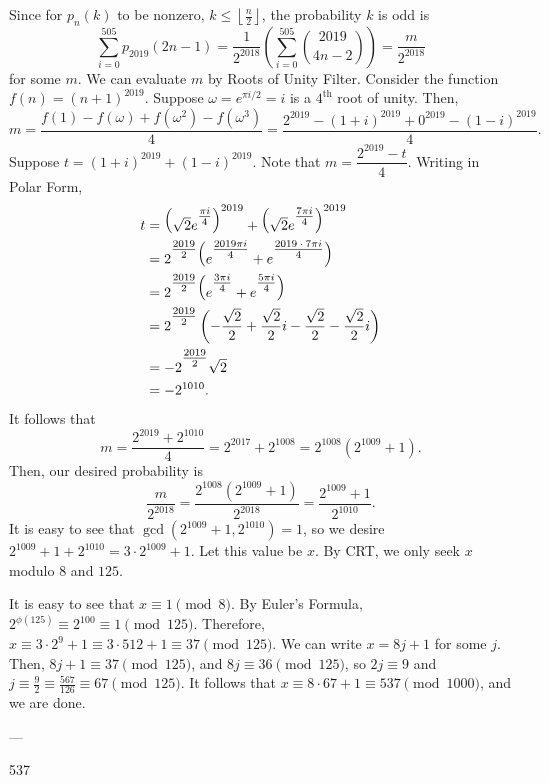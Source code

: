 Since for $p_n(k)$ to be nonzero, $k\le\left\lfloor\frac{n}{2}\right\rfloor$, the probability $k$ is odd is
\[\sum_{i=0}^{505}p_{2019}(2n-1)=\frac{1}{2^{2018}}\left(\sum_{i=0}^{505}\binom{2019}{4n-2}\right)=\frac{m}{2^{2018}}\]
for some $m$. We can evaluate $m$ by Roots of Unity Filter. Consider the function $f(n)=(n+1)^{2019}$. Suppose $\omega=e^{\pi i/2}=i$ is a $4^\text{th}$ root of unity. Then, \[m=\frac{f\left(1\right)-f\left(\omega\right)+f\left(\omega^2\right)-f\left(\omega^3\right)}{4}=\frac{2^{2019}-(1+i)^{2019}+0^{2019}-(1-i)^{2019}}{4}.\]
Suppose $t=(1+i)^{2019}+(1-i)^{2019}$. Note that $m=\dfrac{2^{2019}-t}{4}$. Writing in Polar Form,
\begin{align*}
    t&=\raisebox{4pt}{$\left(\text{\raisebox{-4pt}{$\sqrt{2}e^{\text{\raisebox{4pt}{$\frac{\raisebox{1pt}{$\pi i$}}{\raisebox{-1.75pt}{$4$}}$}}}$}}\right)^{2019}$}+\raisebox{4pt}{$\left(\text{\raisebox{-4pt}{$\sqrt{2}e^{\text{\raisebox{4pt}{$\frac{\raisebox{1pt}{$7\pi i$}}{\raisebox{-1.75pt}{$4$}}$}}}$}}\right)^{2019}$} \\
    &=2^{\text{\raisebox{4pt}{$\frac{\raisebox{1pt}{$2019$}}{\raisebox{-1.75pt}{$2$}}$}}}\text{\raisebox{4pt}{$\left(\text{\raisebox{-4pt}{$e^{\text{\raisebox{4pt}{$\frac{\raisebox{1pt}{$2019\pi i$}}{\raisebox{-1.75pt}{$4$}}$}}}+e^{\text{\raisebox{4pt}{$\frac{\raisebox{1pt}{$2019\cdot 7\pi i$}}{\raisebox{-1.75pt}{$4$}}$}}}$}}\right)$}} \\
    &=2^{\text{\raisebox{4pt}{$\frac{\raisebox{1pt}{$2019$}}{\raisebox{-1.75pt}{$2$}}$}}}\text{\raisebox{4pt}{$\left(\text{\raisebox{-4pt}{$e^{\text{\raisebox{4pt}{$\frac{\raisebox{1pt}{$3\pi i$}}{\raisebox{-1.75pt}{$4$}}$}}}+e^{\text{\raisebox{4pt}{$\frac{\raisebox{1pt}{$5\pi i$}}{\raisebox{-1.75pt}{$4$}}$}}}$}}\right)$}} \\
    &=2^{\text{\raisebox{4pt}{$\frac{\raisebox{1pt}{$2019$}}{\raisebox{-1.75pt}{$2$}}$}}}\left(-\frac{\sqrt{2}}{2}+\frac{\sqrt{2}}{2}i-\frac{\sqrt{2}}{2}-\frac{\sqrt{2}}{2}i\right) \\
    &=-2^{\text{\raisebox{4pt}{$\frac{\raisebox{1pt}{$2019$}}{\raisebox{-1.75pt}{$2$}}$}}}\sqrt{2} \\
    &=-2^{1010}.
\end{align*}
It follows that \[m=\frac{2^{2019}+2^{1010}}{4}=2^{2017}+2^{1008}=2^{1008}\left(2^{1009}+1\right).\]
Then, our desired probability is \[\frac{m}{2^{2018}}=\frac{2^{1008}\left(2^{1009}+1\right)}{2^{2018}}=\frac{2^{1009}+1}{2^{1010}}.\]
It is easy to see that $\gcd\left(2^{1009}+1,2^{1010}\right)=1$, so we desire $2^{1009}+1+2^{1010}=3\cdot 2^{1009}+1$. Let this value be $x$. By CRT, we only seek $x$ modulo $8$ and $125$.

It is easy to see that $x\equiv 1\pmod{8}$. By Euler's Formula, $2^{\phi(125)}\equiv 2^{100}\equiv 1\pmod{125}$. Therefore, $x\equiv 3\cdot 2^9+1\equiv 3\cdot 512+1\equiv 37\pmod{125}$. We can write $x=8j+1$ for some $j$. Then, $8j+1\equiv 37\pmod{125}$, and $8j\equiv 36\pmod{125}$, so $2j\equiv 9$ and $j\equiv\frac{9}{2}\equiv\frac{567}{126}\equiv 67\pmod{125}$. It follows that $x\equiv 8\cdot 67+1\equiv 537\pmod{1000}$, and we are done.

---

537

